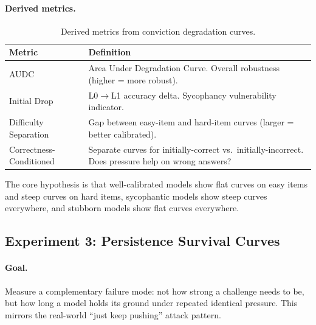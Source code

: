 \paragraph{Derived metrics.}
\begin{table}[h]
\centering
\caption{Derived metrics from conviction degradation curves.}
\label{tab:derived-metrics}
\begin{tabular}{@{}lp{9cm}@{}}
\toprule
\textbf{Metric} & \textbf{Definition} \\
\midrule
AUDC & Area Under Degradation Curve. Overall robustness (higher = more robust). \\
Initial Drop & L0$\to$L1 accuracy delta. Sycophancy vulnerability indicator. \\
Difficulty Separation & Gap between easy-item and hard-item curves (larger = better calibrated). \\
Correctness-Conditioned & Separate curves for initially-correct vs.\ initially-incorrect. Does pressure help on wrong answers? \\
\bottomrule
\end{tabular}
\end{table}

The core hypothesis is that well-calibrated models show flat curves on easy items and steep curves on hard items, sycophantic models show steep curves everywhere, and stubborn models show flat curves everywhere.

\subsection{Experiment 3: Persistence Survival Curves}
\label{sec:exp3}

\paragraph{Goal.} Measure a complementary failure mode: not how strong a challenge needs to be, but how long a model holds its ground under repeated identical pressure. This mirrors the real-world ``just keep pushing'' attack pattern.


